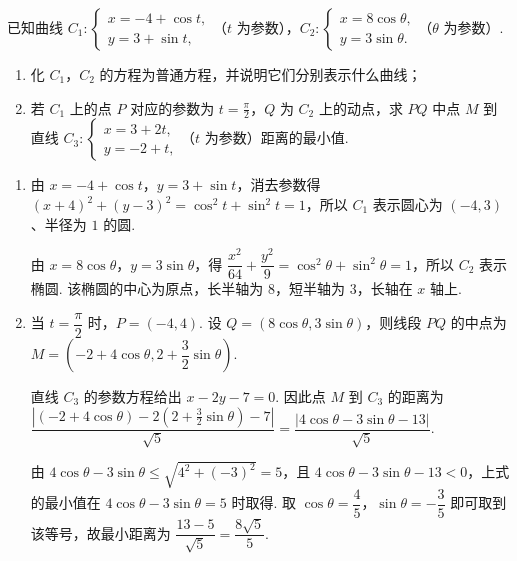 \begin{problem}
已知曲线 \(C_{1}: \begin{cases}
x = -4 + \cos t,\\
y = 3 + \sin t,
\end{cases}\)（\(t\) 为参数），\(C_{2}: \begin{cases}
x = 8\cos \theta,\\
y = 3\sin \theta.
\end{cases}\)（\(\theta\) 为参数）.

\begin{enumerate}
\item 化 \(C_1\)，\(C_2\) 的方程为普通方程，并说明它们分别表示什么曲线；
\item 若 \(C_1\) 上的点 \(P\) 对应的参数为 \(t = \frac{\pi}{2}\)，\(Q\) 为 \(C_2\) 上的动点，求 \(PQ\) 中点 \(M\) 到直线 \(C_{3}: \begin{cases}
x = 3 + 2t,\\
y = -2 + t,
\end{cases}\)（\(t\) 为参数）距离的最小值.
\end{enumerate}
\end{problem}

\begin{solution}
\begin{enumerate}
\item 由 \(x=-4+\cos t\)，\(y=3+\sin t\)，消去参数得
\((x+4)^2+(y-3)^2=\cos^2t+\sin^2t=1\)，所以 \(C_1\) 表示圆心为 \((-4,3)\)、半径为 \(1\) 的圆.

由 \(x=8\cos\theta\)，\(y=3\sin\theta\)，得
\(\dfrac{x^2}{64}+\dfrac{y^2}{9}=\cos^2\theta+\sin^2\theta=1\)，所以 \(C_2\) 表示椭圆. 该椭圆的中心为原点，长半轴为 \(8\)，短半轴为 \(3\)，长轴在 \(x\) 轴上.
\item 当 \(t=\dfrac{\pi}{2}\) 时，\(P=(-4,4)\). 设 \(Q=(8\cos\theta,3\sin\theta)\)，则线段 \(PQ\) 的中点为
\(M=\left(-2+4\cos\theta,2+\dfrac32\sin\theta\right)\).

直线 \(C_3\) 的参数方程给出 \(x-2y-7=0\). 因此点 \(M\) 到 \(C_3\) 的距离为
\(\dfrac{|(-2+4\cos\theta)-2(2+\frac32\sin\theta)-7|}{\sqrt5}=\dfrac{|4\cos\theta-3\sin\theta-13|}{\sqrt5}\).

由 \(4\cos\theta-3\sin\theta\leqslant\sqrt{4^2+(-3)^2}=5\)，且 \(4\cos\theta-3\sin\theta-13<0\)，上式的最小值在 \(4\cos\theta-3\sin\theta=5\) 时取得. 取 \(\cos\theta=\dfrac45\)，\(\sin\theta=-\dfrac35\) 即可取到该等号，故最小距离为
\(\dfrac{13-5}{\sqrt5}=\dfrac{8\sqrt5}{5}\).
\end{enumerate}
\end{solution}

